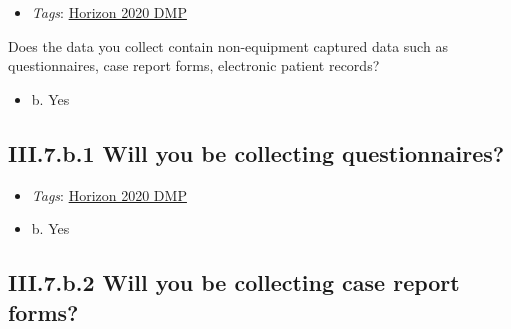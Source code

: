 \documentclass[a4paper,12pt]{report}
\begin{document}
\label{b1df3c74-0b1f-4574-81c4-4cc2d780c1af.f038bd46-ee4e-4f53-b7ea-482381c2c855}


\begin{itemize}
  \item \textit{Tags}: \ul{Horizon 2020 DMP}
  \end{itemize}


\noindent
\begin{markdown}
Does the data you collect contain non-equipment captured data such as questionnaires, case report forms, electronic patient records?
\end{markdown}



\begin{itemize}
  \item[\CheckmarkBold] b. Yes
\end{itemize}




\subsection*{\protect\textcolor{colorSecId}{III.7.b.1} Will you be collecting questionnaires?}

\label{b1df3c74-0b1f-4574-81c4-4cc2d780c1af.f038bd46-ee4e-4f53-b7ea-482381c2c855.4fd89b13-f33c-4858-8b25-ab6da271efc6.85079340-7b80-4dc7-86ae-cc5f599ec737}


\begin{itemize}
  \item \textit{Tags}: \ul{Horizon 2020 DMP}
  \end{itemize}




\begin{itemize}
  \item[\CheckmarkBold] b. Yes
\end{itemize}




\subsection*{\protect\textcolor{colorSecId}{III.7.b.2} Will you be collecting case report forms?}
\end{document}
